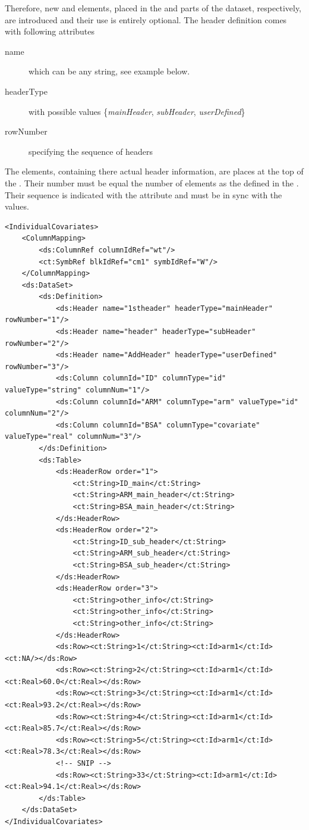 Therefore, new  and  elements, placed in the 
 and  parts of the dataset, respectively, 
are introduced and their use is entirely optional. The header definition comes with 
following attributes
\begin{description}
\item[name] which can be any string, see example below. 
\item[headerType] with possible values \{\emph{mainHeader}, \emph{subHeader},
\emph{userDefined}\} 
\item[rowNumber] specifying the sequence of headers  
\end{description}

The  elements, containing there actual header information, are places
at the top of the . Their number must be equal the number of
 elements as the defined in the . Their sequence is 
indicated with the  attribute and must be in sync with the 
values.
\lstset{language=XML}
\begin{lstlisting}
<IndividualCovariates>
    <ColumnMapping>
        <ds:ColumnRef columnIdRef="wt"/>
        <ct:SymbRef blkIdRef="cm1" symbIdRef="W"/>
    </ColumnMapping>
    <ds:DataSet>
        <ds:Definition>
            <ds:Header name="1stheader" headerType="mainHeader" rowNumber="1"/>
            <ds:Header name="header" headerType="subHeader" rowNumber="2"/>
            <ds:Header name="AddHeader" headerType="userDefined" rowNumber="3"/>
            <ds:Column columnId="ID" columnType="id" valueType="string" columnNum="1"/>
            <ds:Column columnId="ARM" columnType="arm" valueType="id" columnNum="2"/>
            <ds:Column columnId="BSA" columnType="covariate" valueType="real" columnNum="3"/>
        </ds:Definition>
        <ds:Table>
            <ds:HeaderRow order="1">
                <ct:String>ID_main</ct:String>
                <ct:String>ARM_main_header</ct:String>
                <ct:String>BSA_main_header</ct:String>
            </ds:HeaderRow>
            <ds:HeaderRow order="2">
                <ct:String>ID_sub_header</ct:String>
                <ct:String>ARM_sub_header</ct:String>
                <ct:String>BSA_sub_header</ct:String>
            </ds:HeaderRow>
            <ds:HeaderRow order="3">
                <ct:String>other_info</ct:String>
                <ct:String>other_info</ct:String>
                <ct:String>other_info</ct:String>
            </ds:HeaderRow>
            <ds:Row><ct:String>1</ct:String><ct:Id>arm1</ct:Id><ct:NA/></ds:Row>
            <ds:Row><ct:String>2</ct:String><ct:Id>arm1</ct:Id><ct:Real>60.0</ct:Real></ds:Row>
            <ds:Row><ct:String>3</ct:String><ct:Id>arm1</ct:Id><ct:Real>93.2</ct:Real></ds:Row>
            <ds:Row><ct:String>4</ct:String><ct:Id>arm1</ct:Id><ct:Real>85.7</ct:Real></ds:Row>
            <ds:Row><ct:String>5</ct:String><ct:Id>arm1</ct:Id><ct:Real>78.3</ct:Real></ds:Row>
            <!-- SNIP -->
            <ds:Row><ct:String>33</ct:String><ct:Id>arm1</ct:Id><ct:Real>94.1</ct:Real></ds:Row>
        </ds:Table>
    </ds:DataSet>
</IndividualCovariates>
\end{lstlisting}


